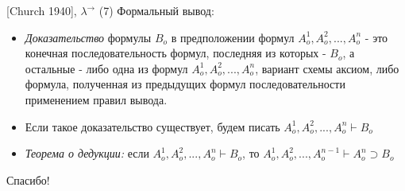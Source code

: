 \documentclass{beamer}
\begin{document}
\begin{frame}{[Church 1940], $\lambda^\to$ (7)}
Формальный вывод:\\
\bigskip
\begin{itemize}
  \item \textit{Доказательство} формулы $B_o$ в предположении формул $A_o^1, A_o^2, ..., A_o^n$ - это конечная последовательность формул, последняя из которых - $B_o$, а остальные - либо одна из формул $A_o^1, A_o^2, ..., A_o^n$, вариант схемы аксиом, либо формула, полученная из предыдущих формул последовательности применением правил вывода.
  \item Если такое доказательство существует, будем писать $A_o^1, A_o^2, ..., A_o^n \vdash B_o$
  \item \textit{Теорема о дедукции:} если $A_o^1, A_o^2, ..., A_o^n \vdash B_o$, то $A_o^1, A_o^2, ..., A_o^{n-1} \vdash A_o^n \supset B_o$
\end{itemize}
\end{frame}


\begin{frame}{}
    \thispagestyle{empty}
    \begin{center}
        {\large Спасибо!}
    \end{center}
\end{frame}


\end{document}
